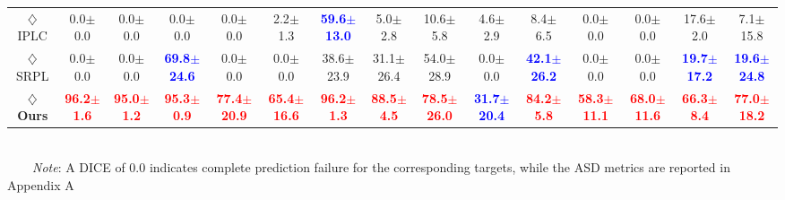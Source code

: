 \begin{table}[ht]
{\begin{tabular}{@{}ccccccccccccccc@{}}
{ $\diamondsuit$ IPLC \cite{iplc}} & {0.0$\pm$0.0} & {0.0$\pm$0.0} & {0.0$\pm$0.0} & {0.0$\pm$0.0} & {2.2$\pm$1.3} & \textcolor{blue}{\textbf{59.6$\pm$13.0}} & {5.0$\pm$2.8} & {10.6$\pm$5.8} & {4.6$\pm$2.9} & {8.4$\pm$6.5} & {0.0$\pm$0.0} & {0.0$\pm$0.0} & {17.6$\pm$2.0} & {7.1$\pm$15.8}\\

{ $\diamondsuit$ SRPL \cite{SRPL}} & {0.0$\pm$0.0} & {0.0$\pm$0.0} & \textcolor{blue}{\textbf{69.8$\pm$24.6}} & {0.0$\pm$0.0} & {0.0$\pm$0.0} & {38.6$\pm$23.9} & {31.1$\pm$26.4} & {54.0$\pm$28.9} & {0.0$\pm$0.0} & \textcolor{blue}{\textbf{42.1$\pm$26.2}} & {0.0$\pm$0.0}& {0.0$\pm$0.0}   & \textcolor{blue}{\textbf{19.7$\pm$17.2}} & \textcolor{blue}{\textbf{19.6$\pm$24.8}}\\ \midrule

{ \textbf{$\diamondsuit$ Ours}} & \textcolor{red}{\textbf{96.2$\pm$1.6}} & \textcolor{red}{\textbf{95.0$\pm$1.2}} & \textcolor{red}{\textbf{95.3$\pm$0.9}} & \textcolor{red}{\textbf{77.4$\pm$20.9}} & \textcolor{red}{\textbf{65.4$\pm$16.6}} & \textcolor{red}{\textbf{96.2$\pm$1.3}} & \textcolor{red}{\textbf{88.5$\pm$4.5}} & \textcolor{red}{\textbf{78.5$\pm$26.0}} & \textcolor{blue}{\textbf{31.7$\pm$20.4}} & \textcolor{red}{\textbf{84.2$\pm$5.8}} & \textcolor{red}{\textbf{58.3$\pm$11.1}} & \textcolor{red}{\textbf{68.0$\pm$11.6}} & \textcolor{red}{\textbf{66.3$\pm$8.4}} & \textcolor{red}{\textbf{77.0$\pm$18.2}}\\ 
\bottomrule
\end{tabular}%
}
\\[2pt]
\footnotesize{~~~~\textit{Note}: A DICE of 0.0 indicates complete prediction failure for the corresponding targets, while the ASD metrics are reported in Appendix A}
\vspace{-5mm}
\end{table}